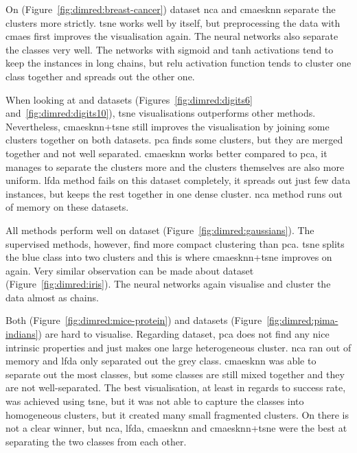 On  (Figure~\ref{fig:dimred:breast-cancer}) dataset \ac{nca} and \ac{cmaesknn} separate the clusters more strictly. \ac{tsne} works well by itself, but preprocessing the data with \ac{cmaes} first improves the visualisation again. The neural networks also separate the classes very well. The networks with sigmoid and \ac{tanh} activations tend to keep the instances in long chains, but \ac{relu} activation function tends to cluster one class together and spreads out the other one.

When looking at  and  datasets (Figures~\ref{fig:dimred:digits6} and~\ref{fig:dimred:digits10}), \ac{tsne} visualisations outperforms other methods. Nevertheless, \ac{cmaesknn}+\ac{tsne} still improves the visualisation by joining some clusters together on both datasets. \ac{pca} finds some clusters, but they are merged together and not well separated. \ac{cmaesknn} works better compared to \ac{pca}, it manages to separate the clusters more and the clusters themselves are also more uniform. \ac{lfda} method fails on this dataset completely, it spreads out just few data instances, but keeps the rest together in one dense cluster. \ac{nca} method runs out of memory on these datasets.

All methods perform well on  dataset (Figure~\ref{fig:dimred:gaussians}). The supervised methods, however, find more compact clustering than \ac{pca}. \ac{tsne} splits the blue class into two clusters and this is where \ac{cmaesknn}+\ac{tsne} improves on again. Very similar observation can be made about  dataset (Figure~\ref{fig:dimred:iris}). The neural networks again visualise and cluster the data almost as chains.

Both  (Figure~\ref{fig:dimred:mice-protein}) and  datasets (Figure~\ref{fig:dimred:pima-indians}) are hard to visualise. Regarding  dataset, \ac{pca} does not find any nice intrinsic properties and just makes one large heterogeneous cluster. \ac{nca} ran out of memory and \ac{lfda} only separated out the grey class. \ac{cmaesknn} was able to separate out the most classes, but some classes are still mixed together and they are not well-separated. The best visualisation, at least in regards to success rate, was achieved using \ac{tsne}, but it was not able to capture the classes into homogeneous clusters, but it created many small fragmented clusters. On  there is not a clear winner, but \ac{nca}, \ac{lfda}, \ac{cmaesknn} and \ac{cmaesknn}+\ac{tsne} were the best at separating the two classes from each other.

